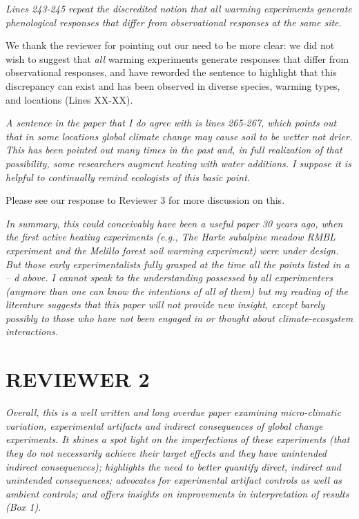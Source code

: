\documentclass[11pt,a4paper]{letter}
\begin{document}
\begin{letter}{}
\emph {Lines 243-245 repeat the discredited notion that all warming experiments generate phenological responses that differ from observational responses at the same site. } 
\par We thank the reviewer for pointing out our need to be more clear: we did not wish to suggest that \emph{all} warming experiments generate responses that differ from observational responses, and have reworded the sentence to highlight that this discrepancy can exist and has been observed in diverse species, warming types, and locations (Lines XX-XX).

\emph{A sentence in the paper that I do agree with is lines 265-267, which points out that in some locations global climate change may cause soil to be wetter not drier.  This has been pointed out many times in the past and, in full realization of that possibility, some researchers augment heating with water additions.  I suppose it is helpful to continually remind ecologists of this basic point.}
\par Please see our response to Reviewer 3 for more discussion on this.

\emph{In summary, this could conceivably have been a useful paper 30 years ago, when the first active heating experiments (e.g., The Harte subalpine meadow RMBL experiment and the Melillo forest soil warming experiment) were under design.  But those early experimentalists fully grasped at the time all the points listed in a -- d above.  I cannot speak to the understanding possessed by all experimenters (anymore than one can know the intentions of all of them) but my reading of the literature suggests that this paper will not provide new insight, except barely possibly to those who have not been engaged in or thought about climate-ecosystem interactions.} 


\section {REVIEWER 2}
\emph{Overall, this is a well written and long overdue paper examining micro-climatic variation, experimental artifacts and indirect consequences of global change experiments.  It shines a spot light on the imperfections of these experiments (that they do not necessarily achieve their target effects and they have unintended indirect consequences); highlights the need to better quantify direct, indirect and unintended consequences; advocates for experimental artifact controls as well as ambient controls;  and offers insights on improvements in interpretation of results (Box 1).}


\end{letter}
\end{document}
